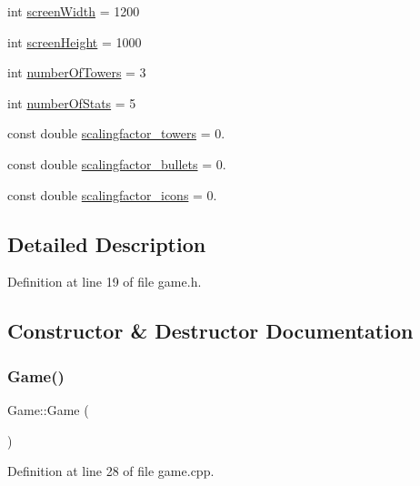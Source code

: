 \begin{DoxyCompactItemize}
\item 
int \hyperlink{class_game_ab1ca40d8527bb09e773bb97030b7a5cc}{screen\+Width} = 1200
\item 
int \hyperlink{class_game_a329351d67993953391a6a65db536c017}{screen\+Height} = 1000
\item 
int \hyperlink{class_game_ad83fa5ba7b6421882d874704c7416033}{number\+Of\+Towers} = 3
\item 
int \hyperlink{class_game_af041d097dc2350360c7951e5a41bc48a}{number\+Of\+Stats} = 5
\item 
const double \hyperlink{class_game_a6c1ca48f17f6934432d01bfa7f762a04}{scalingfactor\+\_\+towers} = 0.
\item 
const double \hyperlink{class_game_aeec547aa25329dcd9d52bfc1c8fa8bb3}{scalingfactor\+\_\+bullets} = 0.
\item 
const double \hyperlink{class_game_a50835e7c47a3e5d6fc919ce3a163be88}{scalingfactor\+\_\+icons} = 0.
\end{DoxyCompactItemize}


\subsection{Detailed Description}


Definition at line 19 of file game.\+h.



\subsection{Constructor \& Destructor Documentation}
\mbox{\label{class_game_ad59df6562a58a614fda24622d3715b65}} 
\subsubsection{\texorpdfstring{Game()}{Game()}}
{\footnotesize\ttfamily Game\+::\+Game (\begin{DoxyParamCaption}{ }\end{DoxyParamCaption})}



Definition at line 28 of file game.\+cpp.


